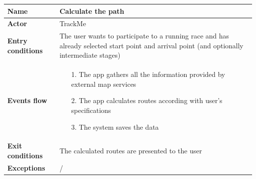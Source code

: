 \begin{table}[]
\begin{adjustbox}{width=\textwidth}
\footnotesize
\begin{tabular}{|p{}|p{}|}
\hline
\textbf{Name}             &  Calculate the path\\ \hline
\textbf{Actor}            &  TrackMe\\ \hline
\textbf{Entry conditions} &  The user wants to participate to a running race and has already selected start point and arrival point (and optionally intermediate stages)\\ \hline
\textbf{Events flow}      &
	\begin{itemize}
		\item[1.] The app gathers all the information provided by external map services
		\item[2.] The app calculates routes according with user's specifications
		\item[3.] The system saves the data
	\end{itemize}\\ \hline
\textbf{Exit conditions}  &  The calculated routes are presented to the user\\ \hline
\textbf{Exceptions}       &  /\\ \hline
\end{tabular}
\end{adjustbox}
\end{table}

